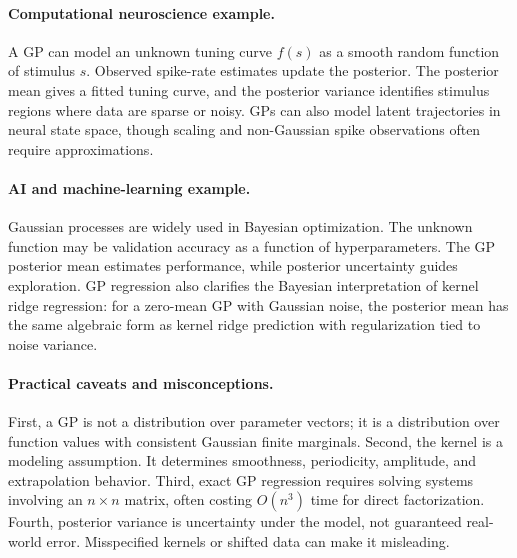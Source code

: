\paragraph{Computational neuroscience example.}
A GP can model an unknown tuning curve \(f(s)\) as a smooth random function of stimulus \(s\). Observed spike-rate estimates update the posterior. The posterior mean gives a fitted tuning curve, and the posterior variance identifies stimulus regions where data are sparse or noisy. GPs can also model latent trajectories in neural state space, though scaling and non-Gaussian spike observations often require approximations.

\paragraph{AI and machine-learning example.}
Gaussian processes are widely used in Bayesian optimization. The unknown function may be validation accuracy as a function of hyperparameters. The GP posterior mean estimates performance, while posterior uncertainty guides exploration. GP regression also clarifies the Bayesian interpretation of kernel ridge regression: for a zero-mean GP with Gaussian noise, the posterior mean has the same algebraic form as kernel ridge prediction with regularization tied to noise variance.

\paragraph{Practical caveats and misconceptions.}
First, a GP is not a distribution over parameter vectors; it is a distribution over function values with consistent Gaussian finite marginals. Second, the kernel is a modeling assumption. It determines smoothness, periodicity, amplitude, and extrapolation behavior. Third, exact GP regression requires solving systems involving an \(n\times n\) matrix, often costing \(O(n^3)\) time for direct factorization. Fourth, posterior variance is uncertainty under the model, not guaranteed real-world error. Misspecified kernels or shifted data can make it misleading.

